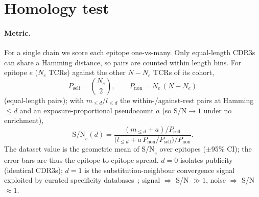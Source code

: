 \section{Homology test}\label{sec:homology}

\paragraph{Metric.} For a single chain we score each epitope one-vs-many. Only
equal-length CDR3s can share a Hamming distance, so pairs are counted within length
bins. For epitope $e$ ($N_e$ TCRs) against the other $N-N_e$ TCRs of its cohort,
\[
P_{\text{self}}=\binom{N_e}{2},\qquad P_{\text{non}}=N_e\,(N-N_e)
\]
(equal-length pairs); with $m_{\le d}$/$l_{\le d}$ the within-/against-rest pairs at
Hamming $\le d$ and an exposure-proportional pseudocount $a$ (so S/N${\to}1$ under no
enrichment),
\[
\mathrm{S/N}_e(d)=\frac{(m_{\le d}+a)/P_{\text{self}}}
{\bigl(l_{\le d}+a\,P_{\text{non}}/P_{\text{self}}\bigr)/P_{\text{non}}}.
\]
The dataset value is the geometric mean of $\mathrm{S/N}_e$ over epitopes ($\pm$95\%
CI); the error bars are thus the epitope-to-epitope spread. $d{=}0$ isolates
publicity (identical CDR3s); $d{=}1$ is the substitution-neighbour convergence signal
exploited by curated specificity databases~\cite{Shugay_2017}; signal $\Rightarrow$
S/N $\gg 1$, noise $\Rightarrow$ S/N $\approx 1$.

